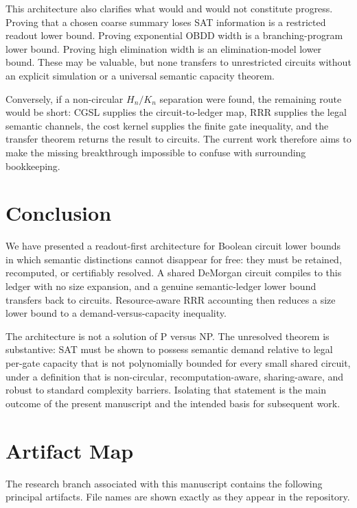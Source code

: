\documentclass[11pt]{article}
\begin{document}
This architecture also clarifies what would and would not constitute progress. Proving that a chosen coarse summary loses SAT information is a restricted readout lower bound. Proving exponential OBDD width is a branching-program lower bound. Proving high elimination width is an elimination-model lower bound. These may be valuable, but none transfers to unrestricted circuits without an explicit simulation or a universal semantic capacity theorem.

Conversely, if a non-circular $H_n/K_n$ separation were found, the remaining route would be short: CGSL supplies the circuit-to-ledger map, RRR supplies the legal semantic channels, the cost kernel supplies the finite gate inequality, and the transfer theorem returns the result to circuits. The current work therefore aims to make the missing breakthrough impossible to confuse with surrounding bookkeeping.

\section{Conclusion}

We have presented a readout-first architecture for Boolean circuit lower bounds in which semantic distinctions cannot disappear for free: they must be retained, recomputed, or certifiably resolved. A shared DeMorgan circuit compiles to this ledger with no size expansion, and a genuine semantic-ledger lower bound transfers back to circuits. Resource-aware RRR accounting then reduces a size lower bound to a demand-versus-capacity inequality.

The architecture is not a solution of P versus NP. The unresolved theorem is substantive: SAT must be shown to possess semantic demand relative to legal per-gate capacity that is not polynomially bounded for every small shared circuit, under a definition that is non-circular, recomputation-aware, sharing-aware, and robust to standard complexity barriers. Isolating that statement is the main outcome of the present manuscript and the intended basis for subsequent work.

\appendix
\section{Artifact Map}

The research branch associated with this manuscript contains the following principal artifacts. File names are shown exactly as they appear in the repository.
\end{document}
